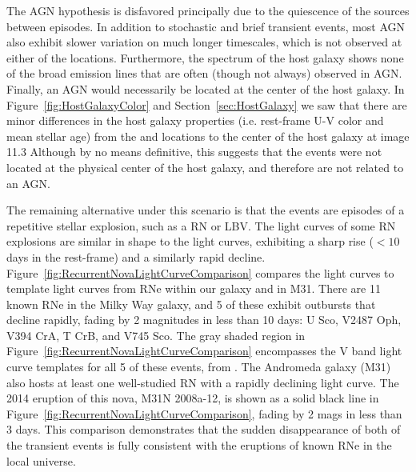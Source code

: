 The AGN hypothesis is disfavored principally due to the quiescence of
the \spock sources between episodes. In addition to stochastic and
brief transient events, most AGN also exhibit slower
variation on much longer timescales, which is not observed at either
of the \spock locations. Furthermore, the spectrum of the \spock host
galaxy shows none of the broad emission lines that are often (though
not always) observed in AGN.  Finally, an AGN would necessarily be
located at the center of the host galaxy.
In Figure~\ref{fig:HostGalaxyColor} and Section~\ref{sec:HostGalaxy}
we saw that there are minor differences in the host galaxy properties
(i.e. rest-frame U-V color and mean stellar age) from the \spockone
and \spocktwo locations to the center of the host galaxy at image 11.3
Although by no means definitive, this suggests that the \spock events
were not located at the physical center of the host galaxy, and
therefore are not related to an AGN.

The remaining alternative under this scenario is that the \spock
events are episodes of a repetitive stellar explosion, such as a RN or
LBV.  The light curves of some RN explosions are similar in shape to
the \spock light curves, exhibiting a sharp rise ($<10$ days in the
rest-frame) and a similarly rapid decline.
Figure~\ref{fig:RecurrentNovaLightCurveComparison} compares the \spock
light curves to template light curves from RNe within our galaxy and
in M31.  There are 11 known RNe in the Milky Way galaxy, and 5 of
these exhibit outbursts that decline rapidly, fading by 2 magnitudes
in less than 10 days: U Sco, V2487 Oph, V394 CrA, T CrB, and V745 Sco.
The gray shaded region in
Figure~\ref{fig:RecurrentNovaLightCurveComparison} encompasses the V
band light curve templates for all 5 of these events, from
\citet{Schaefer:2010}.  The Andromeda galaxy (M31) also hosts at least
one well-studied RN with a rapidly declining light curve.  The 2014
eruption of this nova, M31N 2008a-12, is shown as a solid black line
in Figure~\ref{fig:RecurrentNovaLightCurveComparison}, fading by 2
mags in less than 3 days.  This comparison demonstrates that the
sudden disappearance of both of the \spock transient events is fully
consistent with the eruptions of known RNe in the local universe.

